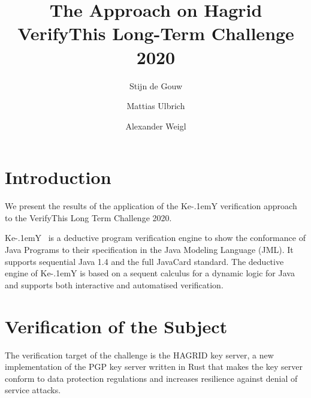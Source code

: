 \documentclass{llncs}
\title{The \KeY Approach on Hagrid
  \\{\small VerifyThis Long-Term Challenge 2020 }}
\author{ Stijn de Gouw \and Mattias Ulbrich \and Alexander Weigl }
\institute{Open University \and Karlsruhe Institute of Technology}
\newcommand{\KeY}{Ke\kern-.1emY\xspace}
\begin{document}
\maketitle

\section{Introduction}

We present the results of the application of the \KeY verification
approach to the VerifyThis Long Term Challenge 2020. 



\KeY~\cite{KeYBook2} is a deductive program verification engine to
show the conformance of Java Programs to their specification in the
Java Modeling Language (JML). It supports sequential Java 1.4 and the
full JavaCard  standard.
%
The deductive engine of \KeY is based on a sequent calculus for a
dynamic logic for Java and supports both interactive and automatised
verification.


\section{Verification of the Subject}
The verification target of the challenge is the HAGRID key server, a
new implementation of the PGP key server written in Rust that makes
the key server conform to data protection regulations and increases
resilience against denial of service attacks.
\end{document}
